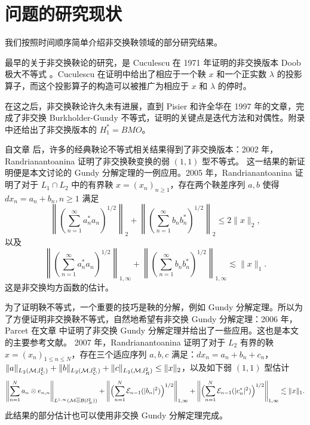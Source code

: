 \section{问题的研究现状}
我们按照时间顺序简单介绍非交换鞅领域的部分研究结果。
\par 最早的关于非交换鞅论的研究，是 Cuculescu 在 1971 年证明的非交换版本 Doob 极大不等式 \cite{C}。Cuculescu 在证明中给出了相应于一个鞅 $x$ 和一个正实数 $\lambda$ 的投影算子，而这个投影算子的构造可以被推广为相应于 $x$ 和 $\lambda$ 的停时。
\par 在这之后，非交换鞅论许久未有进展，直到 Pisier 和许全华在 1997 年的文章\cite{PX1}，完成了非交换 Burkholder-Gundy 不等式，证明的关键点是迭代方法和对偶性。附录中还给出了非交换版本的 $H_1^\ast=BMO$。
\par 自文章\cite{PX1} 后，许多的经典鞅论不等式相关结果得到了非交换版本：2002 年，Randrianantoanina 证明了非交换鞅变换的弱 $(1,1)$ 型不等式\cite{MR1929141-2002-Narcisse}。
这一结果的新证明便是本文讨论的 Gundy 分解定理的一例应用。2005 年\cite{MR2167096-2005-Narcisse}，Randrianantoanina 证明了对于 $L_1\cap L_2$ 中的有界鞅 $x=(x_n)_{n\geq1}$，存在两个鞅差序列 $a,b$ 使得 $dx_n=a_n+b_n,n\geq 1$ 满足
    \[\left\|\left(\sum_{n=1}^\infty
    a_n^*a_n\right)^{1/2}\right\|_2+\left\|\left(\sum_{n=1}^\infty
    b_nb_n^*\right)^{1/2}\right\|_2\le2\|x\|_2,\]
以及
    \[\left\|\left(\sum_{n=1}^\infty
    a_n^*a_n\right)^{1/2}\right\|_{1,\infty}+\left\|\left(\sum_{n=1}^\infty
    b_nb_n^*\right)^{1/2}\right\|_{1,\infty}\lesssim\|x\|_1.\]
这是非交换均方函数的估计。
\par 为了证明鞅不等式，一个重要的技巧是鞅的分解，例如 Gundy 分解定理。所以为了方便证明非交换鞅不等式，自然地希望有非交换 Gundy 分解定理：2006 年，Parcet 在文章 \cite{parcet2006gundy} 中证明了非交换 Gundy 分解定理并给出了一些应用。这也是本文的主要参考文献。
2007 年\cite{MR2319715-2007-Narcisse-Conditioned-square-functions}，Randrianantoanina 证明了对于 $L_2$ 有界的鞅 $x=(x_n)_{1\leq n\leq N}$，存在三个适应序列 $a,b,c$ 满足：$dx_n=a_n+b_n+c_n$，$\|a\|_{L_2(\mathcal{M},l^2_C)}+\|b\|_{L_2(\mathcal{M},l^2_C)}+\|c\|_{L_2(\mathcal{M},l^2_R)}\leq \|x\|_2$，以及如下弱 $(1,1)$ 型估计
    \[  \Biggl\|\sum_{n=1}^N a_n\otimes
    e_{n,n}\Biggr\|_{L^{1,\infty}(\mathcal{M}\overline{\otimes} \mathcal{B}(l^2_N))}
    +\Biggl\|\Bigl(\sum_{n=1}^N
    \mathcal{E}_{n-1}(|b_n|^2)\Bigr)^{1/2}\Biggr\|_{1,\infty}\\
    +\Biggl\|\Bigl(\sum_{n=1}^N
    \mathcal{E}_{n-1}(|c_n^*|^2)\Bigr)^{1/2}\Biggr\|_{1,\infty}\lesssim\|x\|_1.    \]
此结果的部分估计也可以使用非交换 Gundy 分解定理完成。
